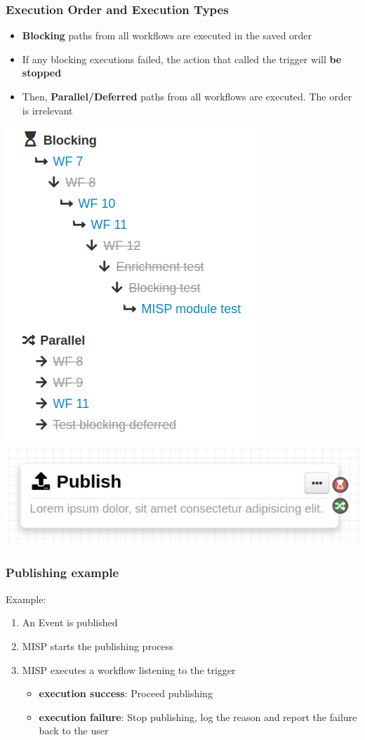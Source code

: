 \begin{frame}
    \frametitle{Execution Order and Execution Types}
    \begin{itemize}
        \item \textbf{Blocking} paths from all workflows are executed in the saved order
        \item If any blocking executions failed, the action that called the trigger will \textbf{be stopped}
        \item Then, \textbf{Parallel/Deferred} paths from all workflows are executed. The order is irrelevant
    \end{itemize}

    \begin{center}
        \includegraphics[width=0.35\linewidth]{pictures/execution-order-2.png}
        \includegraphics[width=0.40\linewidth]{pictures/trigger-outputs.png}
    \end{center}
\end{frame}

\begin{frame}
    \frametitle{Publishing example}
    Example:
    \begin{enumerate}
        \item An Event is published
        \item MISP starts the publishing process
        \item MISP executes a workflow listening to the trigger
        \begin{itemize}
            \item {\bf execution success}: Proceed publishing
            \item {\bf execution failure}: Stop publishing, log the reason and report the failure back to the user
        \end{itemize}
    \end{enumerate}
\end{frame}

